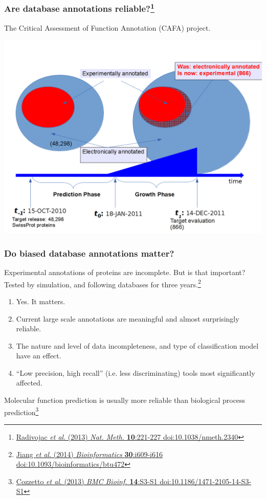 \begin{frame}
  \frametitle{Are database annotations reliable?\footnote{\tiny{\href{http://dx.doi.org/10.1038/nmeth.2340}{Radivojac \textit{et al}. (2013) \textit{Nat. Meth.} \textbf{10}:221-227 doi:10.1038/nmeth.2340}}}}
  The Critical Assessment of Function Annotation (CAFA) project.
  \begin{center}
    \includegraphics[height=0.7\textheight]{images/cafa_annotation_problem}
  \end{center}   
\end{frame}

\begin{frame}
  \frametitle{Do biased database annotations matter?}
  Experimental annotations of proteins are incomplete. But is that important?\\
  Tested by simulation, and following databases for three years.\footnote{\tiny{\href{http://dx.doi.org/10.1093/bioinformatics/btu472}{Jiang \textit{et al}. (2014) \textit{Bioinformatics} \textbf{30}:i609-i616 doi:10.1093/bioinformatics/btu472}}}
  \begin{enumerate}
    \item Yes. It matters.
    \item Current large scale annotations are meaningful and almost surprisingly reliable.
    \item The nature and level of data incompleteness, and type of classification model have an effect.
    \item ``Low precision, high recall'' (i.e. less discriminating) tools most significantly affected.
  \end{enumerate}
  Molecular function prediction is usually more reliable than biological process prediction\footnote{\tiny{\href{http://dx.doi.org/10.1186/1471-2105-14-S3-S1}{Cozzetto \textit{et al}. (2013) \textit{BMC Bioinf.} \textbf{14}:S3-S1 doi:10.1186/1471-2105-14-S3-S1}}}
\end{frame}

